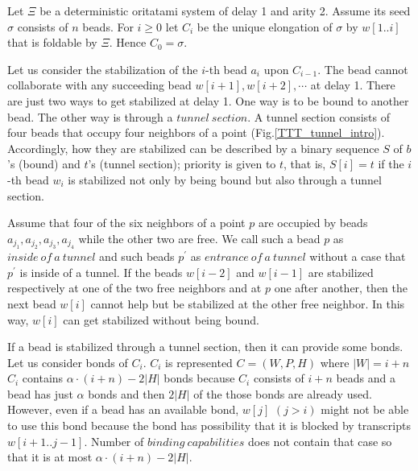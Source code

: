 \documentclass[runningheads]{llncs}
\begin{document}


Let $\Xi$ be a deterministic oritatami system of delay 1 and arity 2. Assume its seed $\sigma$ consists of $n$ beads.
For $i \geq 0$ let $C_i$ be the unique elongation of $\sigma$ by $w[1..i]$ that is foldable by $\Xi$. Hence $C_0 = \sigma$.


Let us consider the stabilization of the $i$-th bead $a_i$ upon $C_{i-1}$. The bead cannot collaborate with any succeeding bead $w[i+1],w[i+2],\cdots$ at delay 1. There are just two ways to get stabilized at delay 1. One way is to be bound to another bead. The other way is through a $tunnel\ section$. A tunnel section consists of four beads that occupy four neighbors of a point (Fig.\ref{TTT_tunnel_intro}). 
Accordingly, how they are stabilized can be described by a binary sequence $S$ of $b$'s (bound) and $t$'s (tunnel section); priority is given to $t$, that is, $S[i] = t$ if the $i$-th bead $w_i$ is stabilized not only by being bound but also through a tunnel section. 

Assume that four of the six neighbors of a point $p$ are occupied by beads $a_{j_1},a_{j_2},a_{j_3},a_{j_4}$ while the other two are free. We call such a bead $p$ as $inside\ of\ a\ tunnel$ and such beads $p^\prime$ as $entrance\ of\ a\ tunnel$ without a case that $p^\prime$ is inside of a tunnel. If the beads $w[i-2]$ and $w[i-1]$ are stabilized respectively at one of the two free neighbors and at $p$ one after another, then the next bead $w[i]$ cannot help but be stabilized at the other free neighbor. In this way, $w[i]$ can get stabilized without being bound.



If a bead is stabilized through a tunnel section, then it can provide some bonds. Let us consider bonds of $C_i$. $C_i$ is represented $C = (W,P,H)$ where $|W| = i + n$ $C_i$ contains $\alpha \cdot (i + n) - 2|H|$ bonds because $C_i$ consists of $i + n$ beads and a bead has just $\alpha$ bonds and then $2 |H|$ of the those bonds are already used. However, even if a bead has an available bond, $w[j]$ $(j > i)$ might not be able to use this bond because the bond has possibility that it is blocked by transcripts $w[i+1..j-1]$. Number of $binding\ capabilities$ does not contain that case so that it is at most $\alpha \cdot (i + n) - 2|H|$.
\end{document}
